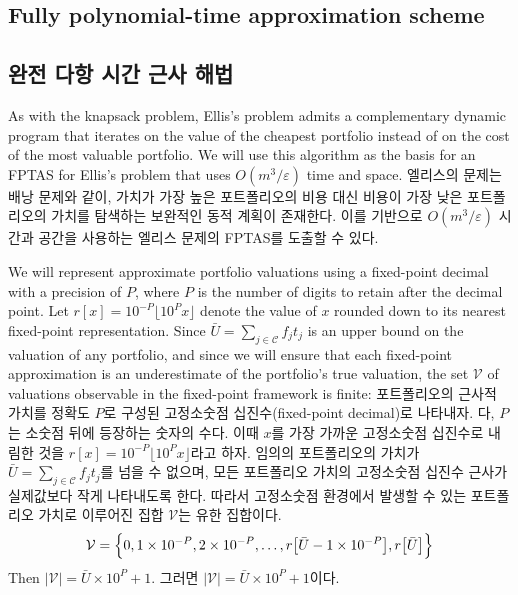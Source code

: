 \documentclass[11pt]{article} %
\theoremstyle{definition}
\theoremstyle{definition}
\begin{document}
\ifen \subsection{Fully polynomial-time approximation scheme}\else \subsection{완전 다항 시간 근사 해법}\fi \label{fptashead}
\ifen 
As with the knapsack problem, Ellis's problem admits a complementary dynamic program that iterates on the value of the cheapest portfolio instead of on the cost of the most valuable portfolio. We will use this algorithm as the basis for an FPTAS for Ellis's problem that uses $O(m^3 / \varepsilon)$ time and space.%
\else
엘리스의 문제는 배낭 문제와 같이, 가치가 가장 높은 포트폴리오의 비용 대신 비용이 가장 낮은 포트폴리오의 가치를 탐색하는 보완적인 동적 계획이 존재한다. 이를 기반으로  $O(m^3 / \varepsilon)$ 시간과 공간을 사용하는 엘리스 문제의 FPTAS를 도출할 수 있다.%
\fi


\ifen 
We will represent approximate portfolio valuations using a fixed-point decimal with a precision of $P$, where $P$ is the number of digits to retain after the decimal point. Let $r[x] =  10^{-P}\lfloor 10^P x \rfloor$ denote the value of $x$ rounded down to its nearest fixed-point representation. Since $\bar U = \sum_{j\in \mathcal{C}} f_j t_j$ is an upper bound on the valuation of any portfolio, and since we will ensure that each fixed-point approximation is an underestimate of the portfolio's true valuation, the set $\mathcal{V}$ of  valuations observable in the fixed-point framework is finite:
\else
포트폴리오의 근사적 가치를 정확도 $P$로 구성된 고정소숫점 십진수(fixed-point decimal)로 나타내자. 다, $P$는 소숫점 뒤에 등장하는 숫자의 수다. 이때 $x$를 가장 가까운 고정소숫점 십진수로 내림한 것을 $r[x] =  10^{-P}\lfloor 10^P x \rfloor$라고 하자. 임의의 포트폴리오의 가치가 $\bar U = \sum_{j\in \mathcal{C}} f_j t_j$를 넘을 수 없으며, 모든 포트폴리오 가치의 고정소숫점 십진수 근사가 실제값보다 작게 나타내도록 한다. 따라서 고정소숫점 환경에서 발생할 수 있는 포트폴리오 가치로 이루어진 집합 $\mathcal{V}$는 유한 집합이다.
\fi
\begin{equation}
\mathcal{V} = \Bigl\{0, 1\times 10^{-P}, 2\times 10^{-P}, \dots, r\bigl[\bar U- 1\times 10^{-P}\bigr], r\bigl[\bar U\bigr]\Bigr\}
\end{equation}
\ifen Then $|\mathcal{V} | = \bar U \times 10^P + 1$.
\else 그러면 $|\mathcal{V} | = \bar U \times 10^P + 1$이다.\fi
\end{document}
